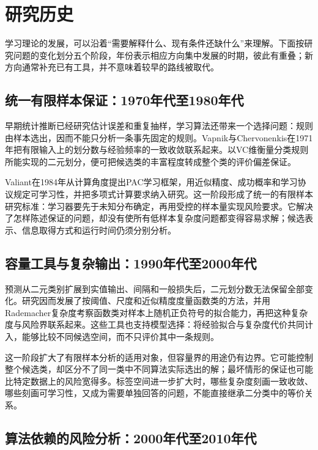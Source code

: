 \FloatBarrier

\section{研究历史}
\label{sec:learning-theory-research-history}

学习理论的发展，可以沿着“需要解释什么、现有条件还缺什么”来理解。下面按研究问题的变化划分五个阶段，年份表示相应方向集中发展的时期，彼此有重叠；新方向通常补充已有工具，并不意味着较早的路线被取代。

\subsection{统一有限样本保证：1970年代至1980年代}

早期统计推断已经研究估计误差和重复抽样，学习算法还带来一个选择问题：规则由样本选出，因而不能只分析一条事先固定的规则。Vapnik与Chervonenkis在1971年把有限输入上的划分数与经验频率的一致收敛联系起来。以VC维衡量分类规则所能实现的二元划分，便可把候选类的丰富程度转成整个类的评价偏差保证。

Valiant在1984年从计算角度提出PAC学习框架，用近似精度、成功概率和学习协议规定可学习性，并把多项式计算要求纳入研究。这一阶段形成了统一的有限样本研究标准：学习器要先于未知分布确定，再用受控的样本量实现风险要求。它解决了怎样陈述保证的问题，却没有使所有低样本复杂度问题都变得容易求解；候选表示、信息取得方式和运行时间仍须分别分析。

\subsection{容量工具与复杂输出：1990年代至2000年代}

预测从二元类别扩展到实值输出、间隔和一般损失后，二元划分数无法保留全部变化。研究因而发展了按阈值、尺度和近似精度度量函数类的方法，并用Rademacher复杂度考察函数类对样本上随机正负符号的拟合能力，再把这种复杂度与风险界联系起来。这些工具也支持模型选择：将经验拟合与复杂度代价共同计入，能够比较不同候选空间，而不只评价其中一条规则。

这一阶段扩大了有限样本分析的适用对象，但容量界的用途仍有边界。它可能控制整个候选类，却区分不了同一类中不同算法实际选出的解；最坏情形的保证也可能比特定数据上的风险宽得多。标签空间进一步扩大时，哪些复杂度刻画一致收敛、哪些刻画可学习性，又成为需要单独回答的问题，不能直接继承二分类中的等价关系。

\subsection{算法依赖的风险分析：2000年代至2010年代}

